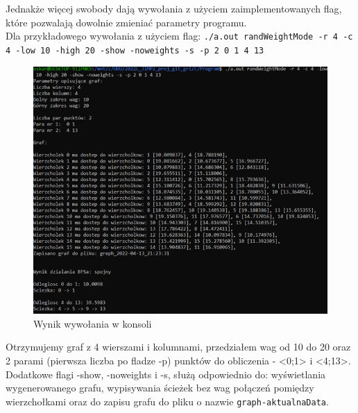 \documentclass{article}
\begin{document}
Jednakże więcej swobody dają wywołania z użyciem zaimplementowanych flag, które pozwalają dowolnie zmieniać parametry programu. \\
Dla przykładowego wywołania z użyciem flag: \texttt{./a.out randWeightMode -r 4 -c 4 -low 10 -high 20 -show -noweights -s -p 2 0 1 4 13} 
\begin{figure}[h]
\centering
\includegraphics[width=1\textwidth]{obraz4.png}
\caption{\label{fig:mod}Wynik wywołania w konsoli}
\end{figure}

Otrzymujemy graf z 4 wierszami i kolumnami, przedziałem wag od 10 do 20 oraz 2 parami (pierwsza liczba po fladze -p) punktów do obliczenia - <0;1> i <4;13>. Dodatkowe flagi -show, -noweights i -s, służą odpowiednio do: wyświetlania wygenerowanego grafu, wypisywania ścieżek bez wag połączeń pomiędzy wierzchołkami oraz do zapisu grafu do pliku o nazwie \texttt{graph-aktualnaData}. \pagebreak
\end{document}
